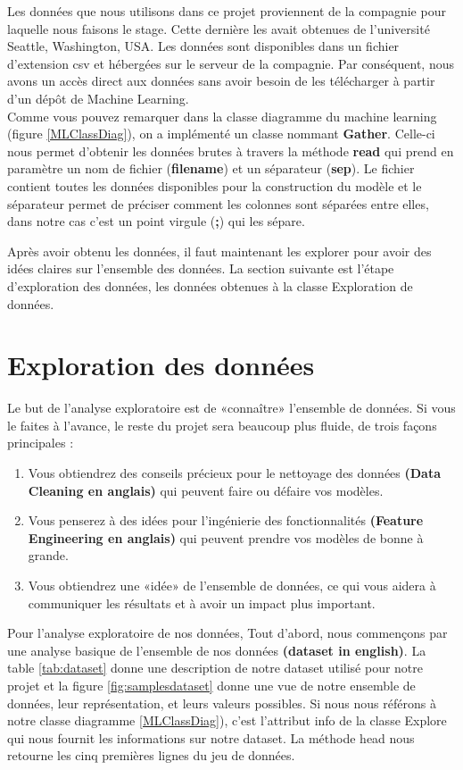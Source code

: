 \documentclass[12pt, french]{report}
\begin{document}
Les données que nous utilisons dans ce projet proviennent de la compagnie pour laquelle nous faisons le stage. Cette dernière les avait obtenues de l'université Seattle, Washington, USA. Les données sont disponibles dans un fichier d'extension csv et hébergées sur le serveur de la compagnie. Par conséquent, nous avons un accès direct aux données sans avoir besoin de les télécharger à partir d'un dépôt de Machine Learning. \\

Comme vous pouvez remarquer dans la classe diagramme du machine learning (figure \ref{MLClassDiag}), on a implémenté un classe nommant \textbf{Gather}. Celle-ci nous permet d'obtenir les données brutes à travers la méthode \textbf{read} qui prend en paramètre un nom de fichier (\textbf{filename}) et un séparateur (\textbf{sep}). Le fichier contient toutes les données disponibles pour la construction du modèle et le séparateur permet de préciser comment les colonnes sont séparées entre elles, dans notre cas c'est un point virgule (\textbf{;}) qui les sépare.

Après avoir obtenu les données, il faut maintenant les explorer pour avoir des idées claires sur l'ensemble des données. La section suivante est l'étape d'exploration des données, les données obtenues à la classe Exploration de données. 

\section{Exploration des données}

Le but de l'analyse exploratoire est de «connaître» l'ensemble de données. Si vous le faites à l'avance, le reste du projet sera beaucoup plus fluide, de trois façons principales \cite{key20}:
\begin{enumerate}
\item Vous obtiendrez des conseils précieux pour le nettoyage des données \textbf{(Data Cleaning en anglais)} qui peuvent faire ou défaire vos modèles.
\item Vous penserez à des idées pour l'ingénierie des fonctionnalités \textbf{(Feature Engineering en anglais)} qui peuvent prendre vos modèles de bonne à grande.
\item Vous obtiendrez une «idée» de l'ensemble de données, ce qui vous aidera à communiquer les résultats et à avoir un impact plus important.
\end{enumerate}

Pour l'analyse exploratoire de nos données, Tout d'abord, nous commençons par une analyse basique de l'ensemble de nos données \textbf{(dataset in english)}. La table \ref{tab:dataset} donne une description de notre dataset utilisé pour notre projet et la figure \ref{fig:samplesdataset} donne une vue de notre ensemble de données, leur représentation, et leurs valeurs possibles. Si nous nous référons à notre classe diagramme \ref{MLClassDiag}), c'est l'attribut info de la classe Explore qui nous fournit les informations sur notre dataset. La méthode head nous retourne les cinq premières lignes du jeu de données.
\end{document}
